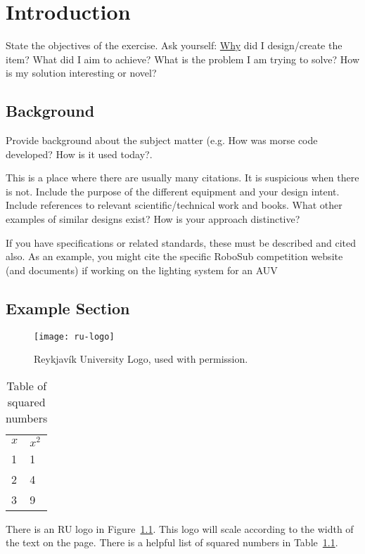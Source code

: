 \chapter{Introduction\label{cha:introduction}}
State the objectives of the exercise. Ask yourself:
\underline{Why} did I design/create the item? What did I aim to
achieve? What is the problem I am trying to solve?  How is my
solution interesting or novel?

\section{Background}
Provide background about the subject matter (e.g. How was morse code
developed?  How is it used today?.

This is a place where there are usually many citations.
It is suspicious when there is not.
Include the purpose of the different equipment and your design intent. 
Include references to relevant scientific/technical work and books.
What other examples of similar designs exist?
How is your approach distinctive?

If you have specifications or related standards, these must be
described and cited also.  As an example, you might cite the specific
RoboSub competition website (and documents) if working on the lighting system for an AUV\cite{guls2016auvlight}

\section{Example Section}
\begin{figure}
  \centering
  \texttt{[image: ru-logo]}
  \caption[RU Logo]{Reykjavík University Logo, used with permission.}\label{fig:ru-logo}
\end{figure}
\begin{table}
  \centering
  \begin{tabular}{ll}
    $x$& $x^{2}$\\
    1 &1\\
    2 &4\\
    3 &9\\
  \end{tabular}
  \caption{Table of squared numbers}\label{tab:numbers}
\end{table}
There is an RU logo in Figure~\ref{fig:ru-logo}.
This logo will scale according to the width of the text on the page.
There is a helpful list of squared numbers in Table~\ref{tab:numbers}.

